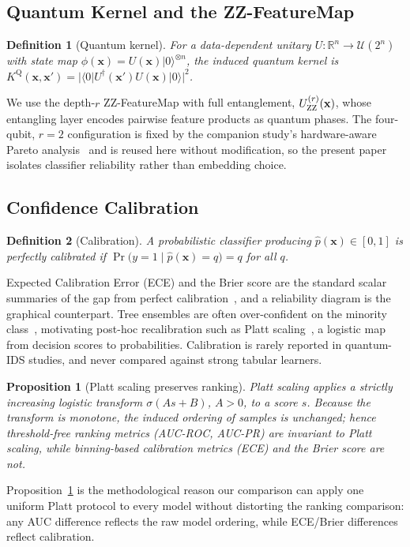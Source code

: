 \documentclass[journal]{IEEEtran}
\newtheorem{definition}{Definition}
\newtheorem{proposition}{Proposition}
\newcommand{\ZZ}{\textsc{ZZ}}
\begin{document}
\subsection{Quantum Kernel and the \ZZ{}-FeatureMap}
\begin{definition}[Quantum kernel]
For a data-dependent unitary $U:\mathbb{R}^n\!\to\!\mathcal{U}(2^n)$ with
state map $\phi(\mathbf{x})=U(\mathbf{x})|0\rangle^{\otimes n}$, the
induced quantum kernel is
$K^{\mathrm{Q}}(\mathbf{x},\mathbf{x}')=
|\langle 0|U^{\dagger}(\mathbf{x}')U(\mathbf{x})|0\rangle|^2$.
\end{definition}
We use the depth-$r$ \ZZ{}-FeatureMap with full entanglement,
$U^{(r)}_{\ZZ}(\mathbf{x})$, whose entangling layer encodes pairwise
feature products as quantum phases. The four-qubit, $r{=}2$
configuration is fixed by the companion study's hardware-aware Pareto
analysis~\cite{companion} and is reused here without modification, so the
present paper isolates classifier reliability rather than embedding
choice.

\subsection{Confidence Calibration}
\begin{definition}[Calibration]
A probabilistic classifier producing $\hat{p}(\mathbf{x})\in[0,1]$ is
\emph{perfectly calibrated} if
$\Pr\!\big(y{=}1\mid\hat{p}(\mathbf{x}){=}q\big)=q$ for all $q$.
\end{definition}
Expected Calibration Error (ECE) and the Brier score are the standard
scalar summaries of the gap from perfect
calibration~\cite{naeini2015ece,brier1950}, and a reliability diagram is
the graphical counterpart. Tree ensembles are often over-confident on the
minority class~\cite{guo2017calibration}, motivating post-hoc
recalibration such as Platt scaling~\cite{platt1999svm}, a logistic map
from decision scores to probabilities. Calibration is rarely reported in
quantum-IDS studies, and never compared against strong tabular learners.

\begin{proposition}[Platt scaling preserves ranking]
\label{prop:platt}
Platt scaling applies a strictly increasing logistic transform
$\sigma(As+B)$, $A{>}0$, to a score $s$. Because the transform is
monotone, the induced ordering of samples is unchanged; hence
threshold-free ranking metrics (AUC-ROC, AUC-PR) are invariant to Platt
scaling, while binning-based calibration metrics (ECE) and the Brier
score are not.
\end{proposition}
Proposition~\ref{prop:platt} is the methodological reason our comparison
can apply one uniform Platt protocol to every model without distorting
the ranking comparison: any AUC difference reflects the raw model
ordering, while ECE/Brier differences reflect calibration.
\end{document}
